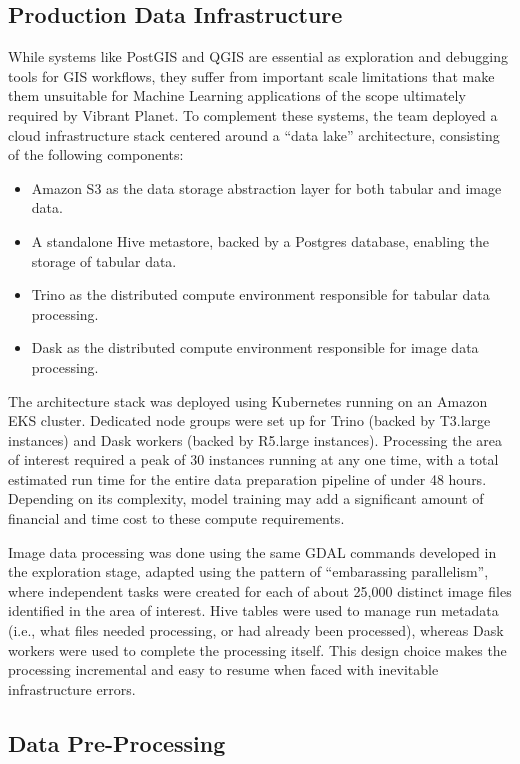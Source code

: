 \subsection{Production Data Infrastructure}

While systems like PostGIS and QGIS are essential as exploration and debugging tools for GIS workflows, they suffer from important scale limitations that make them unsuitable for Machine Learning applications of the scope ultimately required by Vibrant Planet. To complement these systems, the team deployed a cloud infrastructure stack centered around a ``data lake'' architecture, consisting of the following components:
\begin{itemize}
  \item Amazon S3 as the data storage abstraction layer for both tabular and image data.
  \item A standalone Hive metastore, backed by a Postgres database, enabling the storage of tabular data.
  \item Trino as the distributed compute environment responsible for tabular data processing.
  \item Dask as the distributed compute environment responsible for image data processing.
\end{itemize}

The architecture stack was deployed using Kubernetes running on an Amazon EKS cluster. Dedicated node groups were set up for Trino (backed by T3.large instances) and Dask workers (backed by R5.large instances). Processing the area of interest required a peak of 30 instances running at any one time, with a total estimated run time for the entire data preparation pipeline of under 48 hours. Depending on its complexity, model training may add a significant amount of financial and time cost to these compute requirements. 

Image data processing was done using the same GDAL commands developed in the exploration stage, adapted using the pattern of ``embarassing parallelism'', where independent tasks were created for each of about 25,000 distinct image files identified in the area of interest. Hive tables were used to manage run metadata (i.e., what files needed processing, or had already been processed), whereas Dask workers were used to complete the processing itself. This design choice makes the processing incremental and easy to resume when faced with inevitable infrastructure errors.

\subsection{Data Pre-Processing}

